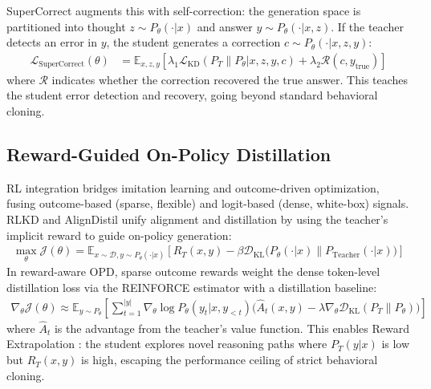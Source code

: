 \documentclass{article} %
\begin{document}
SuperCorrect \citep{2410.09008} augments this with self-correction: the generation space is partitioned into thought $z \sim P_\theta(\cdot|x)$ and answer $y \sim P_\theta(\cdot|x, z)$. If the teacher detects an error in $y$, the student generates a correction $c \sim P_\theta(\cdot|x, z, y)$:
\begin{align}
\mathcal{L}_{\text{SuperCorrect}}(\theta) &= \mathbb{E}_{x, z, y} \left[ \lambda_1 \mathcal{L}_{\text{KD}}(P_T \parallel P_\theta | x, z, y, c) + \lambda_2 \mathcal{R}(c, y_{\text{true}}) \right]
\end{align}
where $\mathcal{R}$ indicates whether the correction recovered the true answer. This teaches the student error detection and recovery, going beyond standard behavioral cloning.

\subsection{Reward-Guided On-Policy Distillation}
RL integration bridges imitation learning and outcome-driven optimization, fusing outcome-based (sparse, flexible) and logit-based (dense, white-box) signals. RLKD \citep{2505.16142} and AlignDistil \citep{2503.02832} unify alignment and distillation by using the teacher's implicit reward to guide on-policy generation:
\begin{align}
\max_{\theta} \mathcal{J}(\theta) = \mathbb{E}_{x \sim \mathcal{D}, y \sim P_\theta(\cdot|x)} \left[ R_T(x, y) - \beta \mathcal{D}_{\text{KL}}\big(P_\theta(\cdot|x) \parallel P_{\text{Teacher}}(\cdot|x)\big) \right] \label{eq:rlkd}
\end{align}
In reward-aware OPD, sparse outcome rewards weight the dense token-level distillation loss via the REINFORCE estimator with a distillation baseline:
\begin{align}
\nabla_\theta \mathcal{J}(\theta) \approx \mathbb{E}_{y \sim P_\theta} \left[ \sum_{t=1}^{|y|} \nabla_\theta \log P_\theta(y_t | x, y_{<t}) \Big( \hat{A}_t(x, y) - \lambda \nabla_\theta \mathcal{D}_{\text{KL}}(P_T \parallel P_\theta) \Big) \right]
\end{align}
where $\hat{A}_t$ is the advantage from the teacher's value function. This enables Reward Extrapolation \citep{2602.12125}: the student explores novel reasoning paths where $P_T(y|x)$ is low but $R_T(x, y)$ is high, escaping the performance ceiling of strict behavioral cloning.
\end{document}
